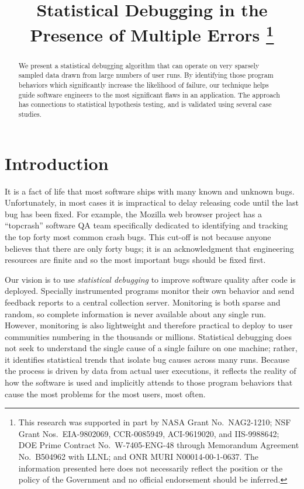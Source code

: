 \documentclass{sig-alternate}
\title{Statistical Debugging in the Presence of Multiple Errors
  \thanks{This research was supported in part by NASA Grant No.\
    NAG2-1210; NSF Grant Nos.\ EIA-9802069, CCR-0085949, ACI-9619020,
    and IIS-9988642; DOE Prime Contract No.\ W-7405-ENG-48 through
    Memorandum Agreement No.\ B504962 with LLNL; and ONR MURI
    N00014-00-1-0637.  The information
    presented here does not necessarily reflect the position or the
    policy of the Government and no official endorsement should be
    inferred.}}
\author{
  \alignauthor Ben Liblit \eecs \\
  \alignauthor Mayur Naik \stan \\
  \alignauthor Alice X.\ Zheng \eecs \\
  \moreauthors
  \global\multiply\auwidth by 3
  \global\divide\auwidth by 2
  \alignauthor Alex Aiken \stan \\
  \alignauthor Michael I.\ Jordan \both
  \moreauthors
  \alignauthor
  \affaddr{\eecs Department of Electrical \\ Engineering and Computer Science} \\
  \affaddr{\stat Department of Statistics} \\
  \affaddr{University of California, Berkeley} \\
  \affaddr{Berkeley, CA 94720-1776}
  \alignauthor
  \affaddr{\stan Computer Science Department} \\
  \affaddr{353 Serra Mall} \\
  \affaddr{Stanford University} \\
  \affaddr{Stanford CA 94305-9025}
}
\newcommand{\termdef}[1]{\textit{#1}}
\begin{document}
\CopyrightYear{2004}
\maketitle

\begin{abstract}
  We present a statistical debugging algorithm that can operate on very
  sparsely sampled data drawn from large numbers of user runs.  By
  identifying those program behaviors which significantly increase the
  likelihood of failure, our technique helps guide software engineers
  to the most significant flaws in an application.  The approach has
  connections to statistical hypothesis testing, and is validated
  using several case studies.
\end{abstract}






\section{Introduction}
\label{sec:introduction}

It is a fact of life that most software ships with many known and
unknown bugs.  Unfortunately, in most cases it is impractical to delay
releasing code until the last bug has been fixed.  For example, the
Mozilla web browser project has a ``topcrash'' software QA team
specifically dedicated to identifying and tracking the top forty most
common crash bugs.  This cut-off is not because anyone believes that
there are only forty bugs; it is an acknowledgment that engineering
resources are finite and so the most important bugs should be fixed
first.

Our vision is to use \termdef{statistical debugging} to improve
software quality after code is deployed.  Specially instrumented
programs monitor their own behavior and send feedback reports to a
central collection server.  Monitoring is both sparse and random, so
complete information is never available about any single run.
However, monitoring is also lightweight and therefore practical to
deploy to user communities numbering in the thousands or millions.
Statistical debugging does not seek to understand the single cause of
a single failure on one machine; rather, it identifies statistical
trends that isolate bug causes across many runs.  Because the process
is driven by data from actual user executions, it reflects the reality
of how the software is used and implicitly attends to those program
behaviors that cause the most problems for the most users, most often.
\end{document}
